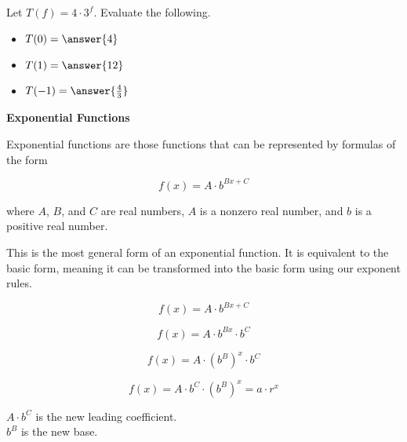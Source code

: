 \documentclass{ximera}
\begin{document}
\begin{example}

Let $T(f) = 4 \cdot 3^f$.  Evaluate the following.

\begin{itemize}
\item $T(0) = \answer{4}$ 
\item $T(1) = \answer{12}$
\item $T(-1) = \answer{\frac{4}{3}}$
\end{itemize}
\end{example}
















\begin{definition} \textbf{\textcolor{green!50!black}{Exponential Functions}}

Exponential functions are those functions that can be represented by formulas of the form


\[      f(x) = A \cdot b^{B x + C}   \]

where $A$, $B$, and $C$ are real numbers, $A$ is a nonzero real number, and $b$ is a positive real number.


\end{definition}



This is the most general form of an exponential function.  It is equivalent to the basic form, meaning it can be transformed into the basic form using our exponent rules.




\[
f(x) = A \cdot b^{B x + C} 
\]

\[
f(x) = A \cdot b^{B x} \cdot  b^C 
\]

\[
f(x) = A \cdot (b^{B})^x \cdot  b^C 
\]


\[
f(x) = A \cdot b^C \cdot (b^{B})^x = a \cdot r^x
\]





$A \cdot b^C$ is the new leading coefficient. \\

$b^{B}$ is the new base.
\end{document}
